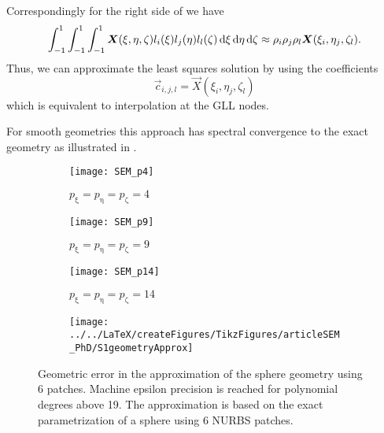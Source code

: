 Correspondingly for the right side of  we have
\begin{equation*}
	\int_{-1}^1\int_{-1}^1\int_{-1}^1 \vec{X}(\xi,\eta,\zeta)l_i(\xi)l_j(\eta)l_l(\zeta)\idiff\xi\idiff\eta\idiff\zeta \approx \rho_i\rho_j\rho_l \vec{X}(\xi_i,\eta_j,\zeta_l).
\end{equation*}
Thus, we can approximate the least squares solution by using the coefficients
\begin{equation*}
	\vec{c}_{i,j,l} = \vec{X}(\xi_i,\eta_j,\zeta_l)
\end{equation*}
which is equivalent to interpolation at the GLL nodes.

For smooth geometries this approach has spectral convergence to the exact geometry as illustrated in .
\begin{figure}
	\centering
	\begin{subfigure}[t]{0.28\textwidth}
		\centering
		\texttt{[image: SEM\_p4]}
		\caption{$p_\upxi=p_\upeta=p_\upzeta=4$}
	\end{subfigure}%
	\hspace*{0.01\textwidth}%
	\begin{subfigure}[t]{0.28\textwidth}
		\centering
		\texttt{[image: SEM\_p9]}
		\caption{$p_\upxi=p_\upeta=p_\upzeta=9$}
	\end{subfigure}%
	\hspace*{0.01\textwidth}%
	\begin{subfigure}[t]{0.28\textwidth}
		\centering
		\texttt{[image: SEM\_p14]}
		\caption{$p_\upxi=p_\upeta=p_\upzeta=14$}
	\end{subfigure}%
	\hspace*{0.01\textwidth}%
	\begin{subfigure}[t]{0.1\textwidth}
		\centering
		\texttt{[image: ../../LaTeX/createFigures/TikzFigures/articleSEM\_PhD/S1geometryApprox]}
	\end{subfigure}
	\caption{Geometric error in the approximation of the sphere geometry using 6 patches. Machine epsilon precision is reached for polynomial degrees above 19. The approximation is based on the exact parametrization of a sphere using 6 NURBS patches.}
	\label{Fig5:spectralGeomteryApprox}
\end{figure}